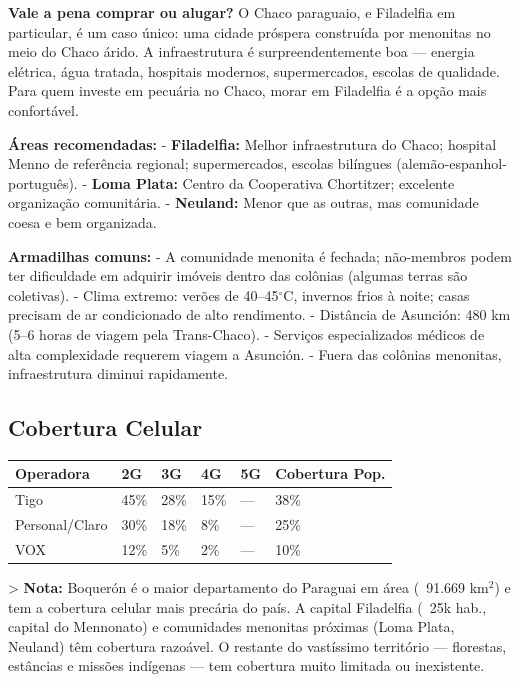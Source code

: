 \textbf{Vale a pena comprar ou alugar?}
O Chaco paraguaio, e Filadelfia em particular, é um caso único: uma cidade próspera construída por menonitas no meio do Chaco árido. A infraestrutura é surpreendentemente boa --- energia elétrica, água tratada, hospitais modernos, supermercados, escolas de qualidade. Para quem investe em pecuária no Chaco, morar em Filadelfia é a opção mais confortável.

\textbf{Áreas recomendadas:}
- \textbf{Filadelfia:} Melhor infraestrutura do Chaco; hospital Menno de referência regional; supermercados, escolas bilíngues (alemão-espanhol-português).
- \textbf{Loma Plata:} Centro da Cooperativa Chortitzer; excelente organização comunitária.
- \textbf{Neuland:} Menor que as outras, mas comunidade coesa e bem organizada.

\textbf{Armadilhas comuns:}
- A comunidade menonita é fechada; não-membros podem ter dificuldade em adquirir imóveis dentro das colônias (algumas terras são coletivas).
- Clima extremo: verões de 40--45$^\circ$C, invernos frios à noite; casas precisam de ar condicionado de alto rendimento.
- Distância de Asunción: 480 km (5--6 horas de viagem pela Trans-Chaco).
- Serviços especializados médicos de alta complexidade requerem viagem a Asunción.
- Fuera das colônias menonitas, infraestrutura diminui rapidamente.




\subsection{Cobertura Celular}



{\small
\setlength{\tabcolsep}{3pt}
\renewcommand{\arraystretch}{1.12}
{\small
\begin{tabularx}{\linewidth}{lXXXXX}
\toprule
Operadora & 2G & 3G & 4G & 5G & Cobertura Pop. \\
\midrule
Tigo & 45\% & 28\% & 15\% & --- & 38\% \\
Personal/Claro & 30\% & 18\% & 8\% & --- & 25\% \\
VOX & 12\% & 5\% & 2\% & --- & 10\% \\
\bottomrule
\end{tabularx}
}
}

> \textbf{Nota:} Boquerón é o maior departamento do Paraguai em área (~91.669 km$^2$) e tem a cobertura celular mais precária do país. A capital Filadelfia (~25k hab., capital do Mennonato) e comunidades menonitas próximas (Loma Plata, Neuland) têm cobertura razoável. O restante do vastíssimo território --- florestas, estâncias e missões indígenas --- tem cobertura muito limitada ou inexistente.


